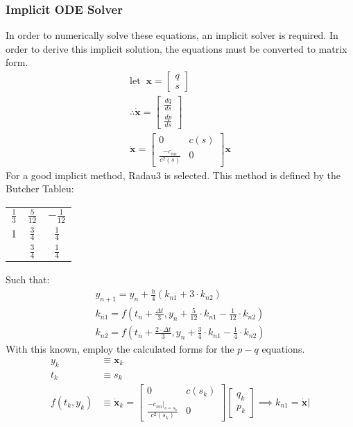 \documentclass{article}
\begin{document}
\subsubsection{Implicit ODE Solver}
In order to numerically solve these equations, an implicit solver is required. In order to derive this implicit solution, the equations must be converted to matrix form.
\begin{align*}
  \textrm{let}\;\;\bm{x}=\begin{bmatrix}q \\ s \end{bmatrix}\\
  \therefore \dot{\bm{x}}=\begin{bmatrix} \frac{dq}{ds} \\ \frac{dp}{ds}\end{bmatrix}\\
  \dot{\bm{x}} = \begin{bmatrix} 0 & c(s) \\ \frac{-c_{nn}}{c^2(s)} & 0\end{bmatrix}\bm{x}
\end{align*}
For a good implicit method, Radau3 is selected. This method is defined by the Butcher Tableu:
\begin{center}
  \begin{tabular}{c|c c}
    $\frac{1}{3}$ & $\frac{5}{12}$ & $-\frac{1}{12}$ \\
    $1$ & $\frac{3}{4}$ & $\frac{1}{4}$ \\
    \hline
                & $\frac{3}{4}$ & $\frac{1}{4}$
  \end{tabular}
\end{center}
Such that:
\begin{align*}
  y_{n+1} = y_n + \frac{h}{4}\left(k_{n1} + 3\cdot k_{n2} \right)\\
  k_{n1}=f(t_n + \frac{\Delta t}{3}, y_n + \frac{5}{12}\cdot k_{n1} -\frac{1}{12}\cdot k_{n2})\\
  k_{n2}=f(t_n + \frac{2\cdot\Delta t}{3}, y_n + \frac{3}{4}\cdot k_{n1} -\frac{1}{4}\cdot k_{n2})
\end{align*}
With this known, employ the calculated forms for the $p-q$ equations.
\begin{align*}
  y_{k}&\equiv\bm{x}_k\\ 
  t_k&\equiv s_k \\
  f(t_k, y_k)&\equiv\dot{\bm{x}}_k=\begin{bmatrix} 0 & c(s_k) \\ \frac{-c_{nn}|_{s=s_k}}{c^2(s_k)} & 0\end{bmatrix}\begin{bmatrix} q_k \\ p_k\end{bmatrix}
  \implies k_{n1} = \dot{\bm{x}}|
\end{align*}
\end{document}
